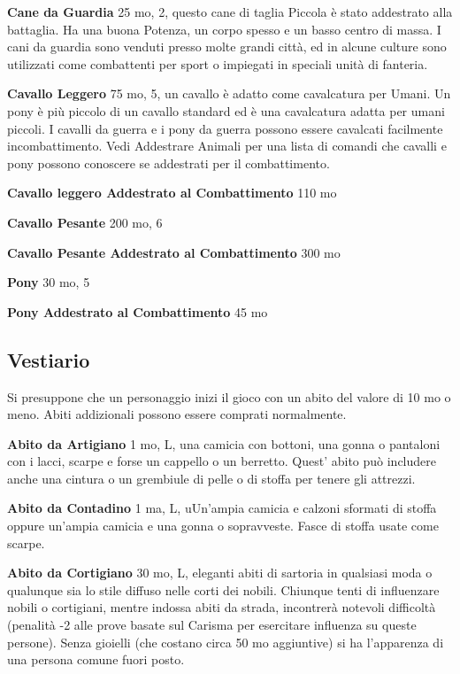 \documentclass[a4paper,11pt,twoside,openany]{book}
\begin{document}
\textbf{Cane da Guardia} 25 mo, 2, questo cane di taglia Piccola è stato addestrato alla battaglia. Ha una buona Potenza, un corpo spesso e un basso centro di massa. I cani da guardia sono venduti presso molte grandi città, ed in alcune culture sono utilizzati come combattenti per sport o impiegati in speciali unità di fanteria.

\textbf{Cavallo Leggero} 75 mo, 5, un cavallo è adatto come cavalcatura per Umani. Un pony è più piccolo di un cavallo standard ed è una cavalcatura adatta per umani piccoli. I cavalli da guerra e i pony da guerra possono essere cavalcati facilmente incombattimento.
Vedi Addestrare Animali per una lista di comandi che cavalli e pony possono conoscere se addestrati per il combattimento.

\textbf{Cavallo leggero Addestrato al Combattimento} 110 mo

\textbf{Cavallo Pesante} 200 mo, 6

\textbf{Cavallo Pesante Addestrato al Combattimento} 300 mo

\textbf{Pony} 30 mo, 5

\textbf{Pony Addestrato al Combattimento} 45 mo

\pagebreak

\subsection{Vestiario}

\label{vestiario}

Si presuppone che un personaggio inizi il gioco con un abito del valore di 10 mo o meno. Abiti addizionali possono essere comprati normalmente.

\textbf{Abito da Artigiano} 1 mo, L, una camicia con bottoni, una gonna o pantaloni con i lacci, scarpe e forse un cappello o un berretto. Quest' abito può includere anche una cintura o un grembiule di pelle o di stoffa per tenere gli attrezzi.

\textbf{Abito da Contadino} 1 ma, L, uUn'ampia camicia e calzoni sformati di stoffa oppure un'ampia camicia e una gonna o sopravveste. Fasce di stoffa usate come scarpe.

\textbf{Abito da Cortigiano} 30 mo, L, eleganti abiti di sartoria in qualsiasi moda o qualunque sia lo stile diffuso nelle corti dei nobili. Chiunque tenti di influenzare nobili o cortigiani, mentre indossa abiti da strada, incontrerà notevoli difficoltà (penalità -2 alle prove basate sul Carisma per esercitare influenza su queste persone). Senza gioielli (che costano circa 50 mo aggiuntive) si ha l'apparenza di una persona comune fuori posto.
\end{document}
